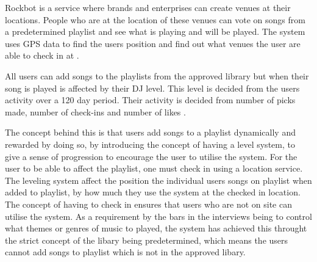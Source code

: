 Rockbot is a service where brands and enterprises can create venues at their locations. People who are at the location of these venues can vote on songs from a predetermined playlist and see what is playing and will be played. The system uses GPS data to find the users position and find out what venues the user are able to check in at \cite{rockbotFeatures}.

All users can add songs to the playlists from the approved library but when their song is played is affected by their DJ level. This level is decided from the users activity over a 120 day period. Their activity is decided from number of picks made, number of check-ins and number of likes \cite{rockbotBlog}.

The concept behind this is that users add songs to a playlist dynamically and rewarded by doing so, by introducing the concept of having a level system, to give a sense of progression to encourage the user to utilise the system. For the user to be able to affect the playlist, one must check in using a location service. The leveling system affect the position the individual users songs on playlist when added to playlist, by how much they use the system at the checked in location. The concept of having to check in ensures that users who are not on site can utilise the system.
As a requirement by the bars in the interviews being to control what themes or genres of music to played, the system has achieved this throught the strict concept of the libary being predetermined, which means the users cannot add songs to playlist which is not in the approved libary. 